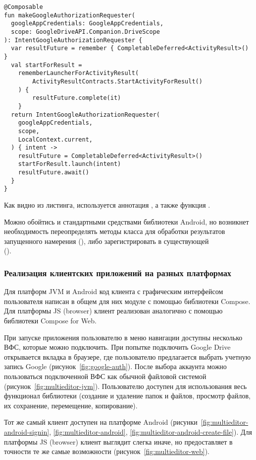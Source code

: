     \begin{verbatim}
@Composable
fun makeGoogleAuthorizationRequester(
  googleAppCredentials: GoogleAppCredentials,
  scope: GoogleDriveAPI.Companion.DriveScope
): IntentGoogleAuthorizationRequester {
  var resultFuture = remember { CompletableDeferred<ActivityResult>() }
  val startForResult =
    rememberLauncherForActivityResult(
        ActivityResultContracts.StartActivityForResult()
    ) {
        resultFuture.complete(it)
    }
  return IntentGoogleAuthorizationRequester(
    googleAppCredentials,
    scope,
    LocalContext.current,
  ) { intent ->
    resultFuture = CompletableDeferred<ActivityResult>()
    startForResult.launch(intent)
    resultFuture.await()
  }
}
    \end{verbatim}
    Как видно из листинга, используется аннотация , а также функция . 
    
    Можно обойтись и стандартными средствами библиотеки Android, но возникнет необходимость переопределять методы класса  для обработки результатов запущенного намерения (), либо зарегистрировать  в существующей \\ ().
    
  \subsubsection{Реализация клиентских приложений на разных платформах}
    Для платформ JVM и Android код клиента с графическим интерфейсом пользователя написан в общем для них модуле с помощью библиотеки Compose\cite{gh-compose-jb}. Для платформы JS (browser) клиент реализован аналогично с помощью библиотеки Compose for Web.

    При запуске приложения пользователю в меню навигации доступны несколько ВФС, которые можно подключить. При попытке подключить Google Drive открывается вкладка в браузере, где пользователю предлагается выбрать учетную запись Google (рисунок~\ref{fig:google-auth}). После выбора аккаунта можно пользоваться подключенной ВФС как обычной файловой системой (рисунок~\ref{fig:multieditor-jvm}). Пользователю доступен для использования весь функционал библиотеки (создание и удаление папок и файлов, просмотр файлов, их сохранение, перемещение, копирование).
    
    Тот же самый клиент доступен на платформе Android  (рисунки~\ref{fig:multieditor-android-signin}, \ref{fig:multieditor-android}, \ref{fig:multieditor-android-create-file}). Для платформы JS (browser) клиент выглядит слегка иначе, но предоставляет в точности те же самые возможности (рисунок~\ref{fig:multieditor-web}).

